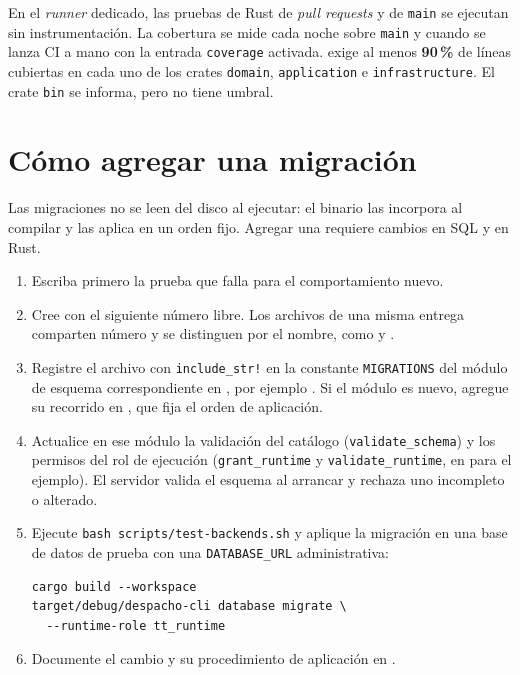 En el \emph{runner} dedicado, las pruebas de Rust de \emph{pull requests} y de
\texttt{main} se ejecutan sin instrumentación. La cobertura se mide cada noche
sobre \texttt{main} y cuando se lanza CI a mano con la entrada
\texttt{coverage} activada.  exige al menos
\textbf{90\,\%} de líneas cubiertas en cada uno de los crates \texttt{domain}, \texttt{application} e
\texttt{infrastructure}. El crate \texttt{bin} se informa, pero no tiene
umbral.


\section{Cómo agregar una migración}\label{sec:mant-migracion}

Las migraciones no se leen del disco al ejecutar: el binario las incorpora al
compilar y las aplica en un orden fijo. Agregar una requiere cambios en SQL y
en Rust.

\begin{enumerate}
  \item Escriba primero la prueba que falla para el comportamiento nuevo.
  \item Cree  con el siguiente número
    libre. Los archivos de una misma entrega comparten número y se
    distinguen por el nombre, como  y
    .
  \item Registre el archivo con \texttt{include\_str!} en la constante
    \texttt{MIGRATIONS} del módulo de esquema correspondiente en
    , por ejemplo
    . Si el módulo es nuevo, agregue su
    recorrido en , que fija
    el orden de aplicación.
  \item Actualice en ese módulo la validación del catálogo
    (\texttt{validate\_schema}) y los permisos del rol de ejecución
    (\texttt{grant\_runtime} y \texttt{validate\_runtime}, en
     para el ejemplo). El servidor
    valida el esquema al arrancar y rechaza uno incompleto o alterado.
  \item Ejecute \texttt{bash scripts/test-backends.sh} y aplique la
    migración en una base de datos de prueba con una
    \texttt{DATABASE\_URL} administrativa:
\begin{verbatim}
cargo build --workspace
target/debug/despacho-cli database migrate \
  --runtime-role tt_runtime
\end{verbatim}
  \item Documente el cambio y su procedimiento de aplicación en
    .
\end{enumerate}

